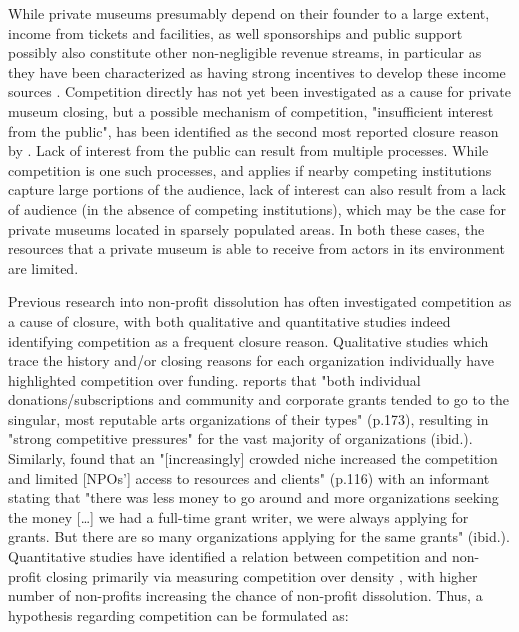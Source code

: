 \documentclass[12pt]{article}
\begin{document}
While private museums presumably depend on their founder to a large extent, income from tickets and facilities, as well sponsorships and public support possibly also constitute other non-negligible revenue streams, in particular as they have been characterized as having strong incentives to develop these income sources \parencite{Frey_Meier_2002_beyeler}.
Competition directly has not yet been investigated as a cause for private museum closing, but a possible mechanism of competition, "insufficient interest from the public", has been identified as the second most reported closure reason by \textcite[p.6]{Velthuis_Gera_2024_fragility}. 
Lack of interest from the public can result from multiple processes.
While competition is one such processes, and applies if nearby competing institutions capture large portions of the audience, lack of interest can also result from a lack of audience (in the absence of competing institutions), which may be the case for private museums located in sparsely populated areas.
In both these cases, the resources that a private museum is able to receive from actors in its environment are limited. 



Previous research into non-profit dissolution has often investigated competition as a cause of closure, with both qualitative and quantitative studies indeed identifying competition as a frequent closure reason.
Qualitative studies which trace the history and/or closing reasons for each organization individually have highlighted competition over funding.
\textcite{Hager_1999_demise} reports that "both individual donations/subscriptions and community and corporate grants tended to go to the singular, most reputable arts organizations of their types" (p.173), resulting in "strong competitive pressures" for the vast majority of organizations (ibid.).
Similarly, \textcite{HernandezOrtiz_2022_discontinuity} found that an "[increasingly] crowded niche increased the competition and limited [NPOs'] access to resources and clients" (p.116) with an informant stating that "there was less money to go around and more organizations seeking the money [\ldots{}] we had a full-time grant writer, we were always applying for grants. But there are so many organizations applying for the same grants" (ibid.).
Quantitative studies have identified a relation between competition and non-profit closing primarily via measuring competition over density \parencite{Park_Shon_Lu_2021_mortality,Haugh_etal_2021_nascent,Lu_Shon_Zhang_2019_dissolution}, with higher number of non-profits increasing the chance of non-profit dissolution.
Thus, a hypothesis regarding competition can be formulated as:
\end{document}
